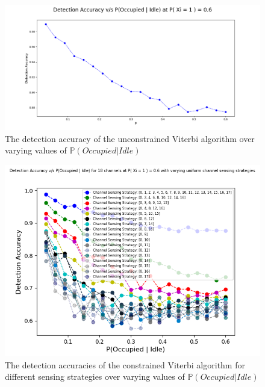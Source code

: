 \documentclass[10pt,twocolumn]{IEEEtran}
\begin{document}
\begin{figure}
    \centering
    \includegraphics[scale=0.255]{DetectionAccuracy_v_p_test_3_final.png}
    \caption{The detection accuracy of the unconstrained Viterbi algorithm over varying values of $\mathbb{P}(Occupied|Idle)$}
    \label{fig:2}
\end{figure}
\begin{figure}
    \centering
    \includegraphics[scale=0.5]{Uniform_Channel_Sensing.png}
    \caption{The detection accuracies of the constrained Viterbi algorithm for different sensing strategies over varying values of $\mathbb{P}(Occupied|Idle)$}
    \label{fig:3}
\end{figure}
\end{document}
